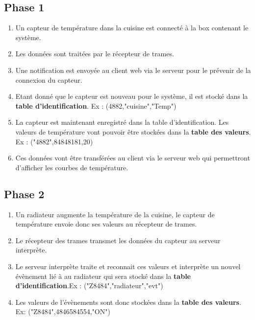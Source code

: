 \documentclass[10pt,a4paper]{article}
\begin{document}
\subsection{Phase 1}
\begin{enumerate}
\item Un capteur de température dans la cuisine est connecté à la box contenant le système.
\item Les données sont traitées par le récepteur de trames.
\item Une notification est envoyée au client web via le serveur pour le prévenir de la connexion du capteur.
\item Etant donné que le capteur est nouveau pour le système, il est stocké dans la \textbf{table d'identification}. Ex : (4882,"cuisine","Temp")
\item La capteur est maintenant enregistré dans la table d'identification. Les valeurs de température vont pouvoir être stockées dans la \textbf{table des valeurs}. Ex : ("4882",84848181,20)
\item Ces données vont être transférées au client via le serveur web qui permettront d'afficher les courbes de température.
\end{enumerate}
\subsection{Phase 2}
\begin{enumerate}
\item Un radiateur augmente la température de la cuisine, le capteur de température envoie donc ses valeurs au récepteur de trames.
\item Le récepteur des trames transmet les données du capteur au serveur interprète.
\item Le serveur interprète traite et reconnait ces valeurs et interprète un nouvel évènement lié à au radiateur qui sera stocké dans la \textbf{table d'identification}.Ex : ("Z8484","radiateur","evt")
\item Les valeurs de l'évènements sont donc stockées dans la \textbf{table des valeurs}. Ex: ("Z8484",4846584554,"ON")
\end{enumerate}
\end{document}
